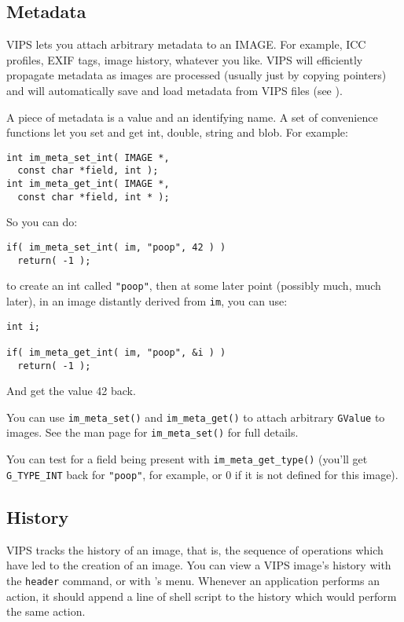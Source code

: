 \subsection{Metadata}
\label{sec:meta}

VIPS lets you attach arbitrary metadata to an IMAGE. For example, ICC
profiles, EXIF tags, image history, whatever you like. VIPS will efficiently
propagate metadata as images are processed (usually just by copying
pointers) and will automatically save and load metadata from VIPS files
(see ).

A piece of metadata is a value and an identifying name. A set of
convenience functions let you set and get int, double, string and blob. For
example:

\begin{verbatim}
int im_meta_set_int( IMAGE *,
  const char *field, int );
int im_meta_get_int( IMAGE *,
  const char *field, int * );
\end{verbatim}

So you can do:

\begin{verbatim}
if( im_meta_set_int( im, "poop", 42 ) )
  return( -1 );
\end{verbatim}

\noindent
to create an int called \verb+"poop"+, then at some later point (possibly much,
much later), in an image distantly derived from \verb+im+, you can use:

\begin{verbatim}
int i;

if( im_meta_get_int( im, "poop", &i ) )
  return( -1 );
\end{verbatim}

\noindent
And get the value 42 back. 

You can use \verb+im_meta_set()+ and \verb+im_meta_get()+ to attach arbitrary
\verb+GValue+ to images.  See the man page for \verb+im_meta_set()+ for
full details.

You can test for a field being present with \verb+im_meta_get_type()+ (you'll
get \verb+G_TYPE_INT+ back for \verb+"poop"+, for example, or 0 if it is not
defined for this image).

\subsection{History}
\label{sec:history}

VIPS tracks the history of an image, that is, the sequence of operations which
have led to the creation of an image. You can view a VIPS image's history with
the \verb+header+ command, or with \nip{}'s  menu. Whenever an
application performs an action, it should append a line of shell script to the
history which would perform the same action.

